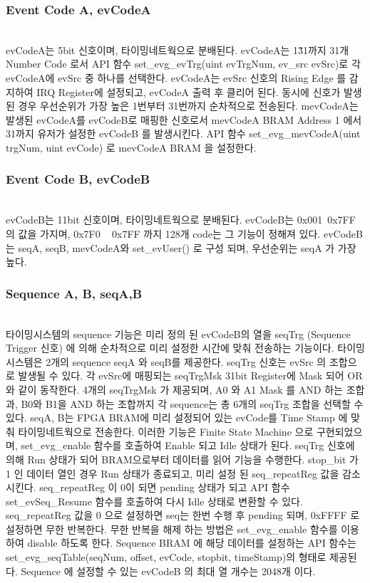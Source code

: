 \documentclass[journal]{IEEEtran}
\begin{document}
\subsubsection{Event Code A, evCodeA}\hspace*{\fill} \\
evCodeA는 5bit 신호이며, 타이밍네트웍으로 분배된다. evCodeA는 1\~31까지 31개 Number Code 로서 API 함수 set\_evg\_evTrg(uint evTrgNum, ev\_src evSrc)로 각 evCodeA에 evSrc 중 하나를 선택한다. evCodeA는 evSrc 신호의 Rising Edge 를 감지하여 IRQ Register에 설정되고, evCodeA 출력 후 클리어 된다. 동시에 신호가 발생된 경우 우선순위가 가장 높은 1번부터 31번까지 순차적으로 전송된다.
mevCodeA는 발생된 evCodeA를 evCodeB로 매핑한 신호로서 mevCodeA BRAM Address 1 에서 31까지 유저가 설정한 evCodeB 를 발생시킨다. API 함수 set\_evg\_mevCodeA(uint trgNum, uint evCode) 로 mevCodeA BRAM 을 설정한다.

\subsubsection{Event Code B, evCodeB}\hspace*{\fill} \\
evCodeB는 11bit 신호이며, 타이밍네트웍으로 분배된다. evCodeB는 0x001~0x7FF 의 값을 가지며, 0x7F0 ~ 0x7FF 까지 128개 code는 그 기능이 정해져 있다. 
evCodeB는 seqA, seqB, mevCodeA와 set\_evUser() 로 구성 되며, 우선순위는 seqA 가 가장 높다. 

\subsubsection{Sequence A, B, seqA,B}\hspace*{\fill} \\
타이밍시스템의 sequence 기능은 미리 정의 된 evCodeB의 열을 seqTrg (Sequence Trigger 신호) 에 의해 순차적으로 미리 설정한 시간에 맞춰 전송하는 기능이다. 타이밍시스템은 2개의 sequence seqA 와 seqB를 제공한다. seqTrg 신호는 evSrc 의 조합으로 발생될 수 있다. 각 evSrc에 매핑되는 seqTrgMsk 31bit Register에 Mask 되어 OR와 같이 동작한다. 4개의 seqTrgMsk 가 제공되며, A0 와 A1 Mask 를 AND 하는 조합과, B0와 B1을 AND 하는 조합까지 각 sequence는 총 6개의 seqTrg 조합을 선택할 수 있다. seqA, B는 FPGA BRAM에 미리 설정되어 
있는 evCode를 Time Stamp 에 맞춰 타이밍네트웍으로 전송한다. 이러한 기능은 Finite State Machine 으로 구현되었으며, set\_evg\_enable 함수를 호출하여 Enable 되고 Idle 상태가 된다. seqTrg 신호에 의해 Run 상태가 되어 BRAM으로부터 데이터를 읽어 기능을 수행한다. stop\_bit 가 1 인 데이터 열인 경우 Run 상태가 종료되고, 미리 설정 된 seq\_repeatReg 값을
감소시킨다. seq\_repeatReg 이 0이 되면 pending 상태가 되고 API 함수 set\_evSeq\_Resume 함수를 호출하여 다시 Idle 상태로 변환할 수 있다. seq\_repeatReg 값을 0 으로 설정하면 seq는 한번 수행 후 pending 되며, 0xFFFF 로 설정하면 무한 반복한다. 무한 반복을 해제 하는 방법은 set\_evg\_enable 함수를 이용하여 disable 하도록 한다.
Sequence BRAM 에 해당 데이터를 설정하는 API 함수는 set\_evg\_seqTable(seqNum,  offset, evCode, stopbit, timeStamp)의 형태로 제공된다. Sequence 에 설정할 수 있는 evCodeB 의 최대 열 개수는 2048개 이다.
\end{document}
